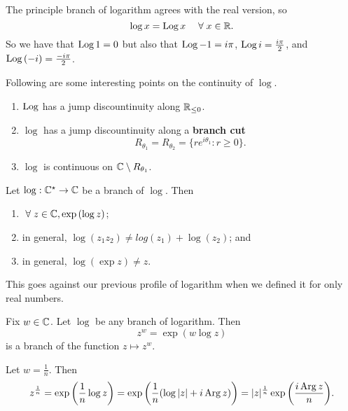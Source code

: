 
\begin{remark}
    The principle branch of logarithm agrees with the real version, so \[ \log{x} = \operatorname{Log}{x} \quad \;\forall\; x \in \mathbb{R}. \] So we have that $\operatorname{Log}{1} = 0$ but also that $\operatorname{Log}{-1} = i\pi$, $\operatorname{Log}{i} = \frac{i\pi}{2}$, and $\operatorname{Log}{(-i)}=\frac{-i\pi}{2}$.
\end{remark}

Following are some interesting points on the continuity of $\log$.

\begin{remark}
    \begin{enumerate}
        \item $\operatorname{Log}$ has a jump discountinuity along $\mathbb{R}_{\leq 0}$.
        \item $\log$ has a jump discountinuity along a \textbf{branch cut} \[R_{\theta_1} = R_{\theta_2} = \{re^{i\theta_1} : r \geq 0\}.\]
        \item $\log$ is continuous on $\mathbb{C} \setminus R_{\theta_1}$.
    \end{enumerate}  
\end{remark}

\begin{lemma}
    Let $\log: \mathbb{C}^{\star} \to \mathbb{C}$ be a branch of $\log$. Then 
    \begin{enumerate}
        \item $\;\forall\; z \in \mathbb{C}, \exp{(\log{z})}$;
        \item in general, $\log(z_1z_2) \neq log(z_1) + \log(z_2)$; and
        \item in general, $\log{(\exp{z})} \neq z$.
    \end{enumerate}
\end{lemma}

This goes against our previous profile of logarithm when we defined it for only real numbers.

\begin{definition}
    Fix $w \in \mathbb{C}$. Let $\log$ be any branch of logarithm. Then \[z^w = \exp{(w\log{z})}\] is a branch of the function $z \mapsto z^w$.
\end{definition}

\begin{example}
    Let $w = \frac 1n$. Then \[ z^{\frac 1n} = \exp{\left(\frac 1n \log{z}\right)} = \exp{\left(\frac 1n (\log{\lvert z \rvert} + i\operatorname{Arg}{z})\right)} = \lvert z \rvert^{\frac 1n} \exp{\left( \frac{i\operatorname{Arg}{z}}{n} \right)}. \]
\end{example}

